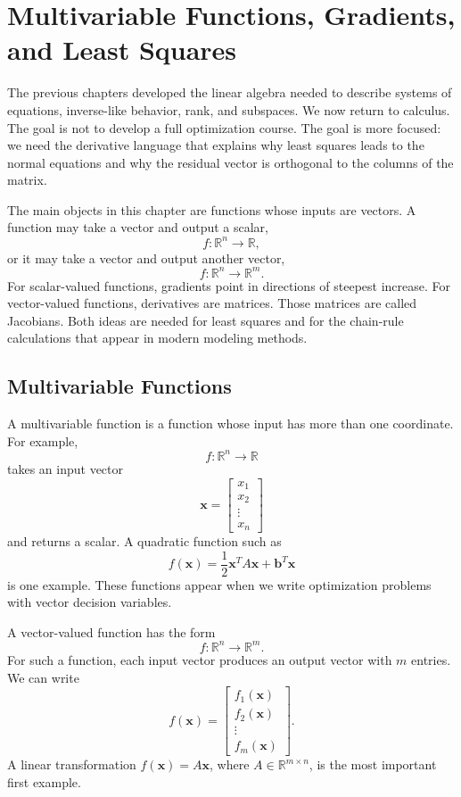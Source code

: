 \chapter{Multivariable Functions, Gradients, and Least Squares}
\label{mf:ch12-multivariable-functions-gradients-least-squares}

The previous chapters developed the linear algebra needed to describe systems of equations, inverse-like behavior, rank, and subspaces. We now return to calculus. The goal is not to develop a full optimization course. The goal is more focused: we need the derivative language that explains why least squares leads to the normal equations and why the residual vector is orthogonal to the columns of the matrix.

The main objects in this chapter are functions whose inputs are vectors. A function may take a vector and output a scalar,
\[
    f:\mathbb{R}^n\to\mathbb{R},
\]
or it may take a vector and output another vector,
\[
    f:\mathbb{R}^n\to\mathbb{R}^m.
\]
For scalar-valued functions, gradients point in directions of steepest increase. For vector-valued functions, derivatives are matrices. Those matrices are called Jacobians. Both ideas are needed for least squares and for the chain-rule calculations that appear in modern modeling methods.

\section{Multivariable Functions}
\label{mf:multivariable-functions}

A multivariable function is a function whose input has more than one coordinate. For example,
\[
    f:\mathbb{R}^n\to\mathbb{R}
\]
takes an input vector
\[
    \mathbf{x}=\begin{bmatrix}x_1\\x_2\\ \vdots\\x_n\end{bmatrix}
\]
and returns a scalar. A quadratic function such as
\[
    f(\mathbf{x})=\frac{1}{2}\mathbf{x}^T A\mathbf{x}+\mathbf{b}^T\mathbf{x}
\]
is one example. These functions appear when we write optimization problems with vector decision variables.

A vector-valued function has the form
\[
    f:\mathbb{R}^n\to\mathbb{R}^m.
\]
For such a function, each input vector produces an output vector with \(m\) entries. We can write
\[
    f(\mathbf{x})=\begin{bmatrix}
        f_1(\mathbf{x})\\
        f_2(\mathbf{x})\\
        \vdots\\
        f_m(\mathbf{x})
    \end{bmatrix}.
\]
A linear transformation \(f(\mathbf{x})=A\mathbf{x}\), where \(A\in\mathbb{R}^{m\times n}\), is the most important first example.

